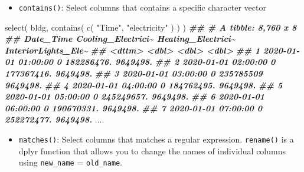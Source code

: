 \documentclass[
]{book}
\newenvironment{Shaded}{\begin{snugshade}}{\end{snugshade}}
\newcommand{\DocumentationTok}[1]{\textcolor[rgb]{0.56,0.35,0.01}{\textbf{\textit{#1}}}}
\newcommand{\FunctionTok}[1]{\textcolor[rgb]{0.00,0.00,0.00}{#1}}
\newcommand{\NormalTok}[1]{#1}
\newcommand{\StringTok}[1]{\textcolor[rgb]{0.31,0.60,0.02}{#1}}
\providecommand{\tightlist}{%
  \setlength{\itemsep}{0pt}\setlength{\parskip}{0pt}}
\begin{document}
\begin{itemize}
\tightlist
\item
  \texttt{contains()}: Select columns that contains a specific character vector
\end{itemize}

\begin{Shaded}
\begin{Highlighting}[]
\FunctionTok{select}\NormalTok{(}
\NormalTok{  bldg,}
  \FunctionTok{contains}\NormalTok{(}
    \FunctionTok{c}\NormalTok{(}
      \StringTok{"Time"}\NormalTok{,}
      \StringTok{"electricity"}
\NormalTok{    )}
\NormalTok{  )}
\NormalTok{)}
\DocumentationTok{\#\# \# A tibble: 8,760 x 8}
\DocumentationTok{\#\#    Date\_Time           Cooling\_Electrici\textasciitilde{} Heating\_Electrici\textasciitilde{} InteriorLights\_Ele\textasciitilde{}}
\DocumentationTok{\#\#    \textless{}dttm\textgreater{}                           \textless{}dbl\textgreater{}              \textless{}dbl\textgreater{}               \textless{}dbl\textgreater{}}
\DocumentationTok{\#\#  1 2020{-}01{-}01 01:00:00                  0         182286476.            9649498.}
\DocumentationTok{\#\#  2 2020{-}01{-}01 02:00:00                  0         177367416.            9649498.}
\DocumentationTok{\#\#  3 2020{-}01{-}01 03:00:00                  0         235785509             9649498.}
\DocumentationTok{\#\#  4 2020{-}01{-}01 04:00:00                  0         184762495.            9649498.}
\DocumentationTok{\#\#  5 2020{-}01{-}01 05:00:00                  0         245249657.            9649498.}
\DocumentationTok{\#\#  6 2020{-}01{-}01 06:00:00                  0         190670331.            9649498.}
\DocumentationTok{\#\#  7 2020{-}01{-}01 07:00:00                  0         252272477.            9649498.}
\NormalTok{....}
\end{Highlighting}
\end{Shaded}

\begin{itemize}
\tightlist
\item
  \texttt{matches()}: Select columns that matches a regular expression. \texttt{rename()} is a dplyr function that allows you to change the names of individual columns using \texttt{new\_name} = \texttt{old\_name}.
\end{itemize}
\end{document}
